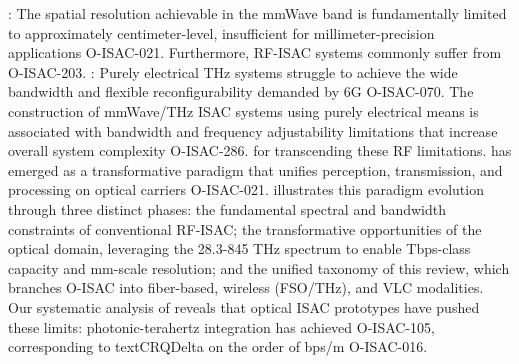 : The spatial resolution achievable in the mmWave band is fundamentally limited to approximately centimeter-level, insufficient for millimeter-precision applications O-ISAC-021. Furthermore, RF-ISAC systems commonly suffer from  O-ISAC-203.\markdownRendererOlItemEnd 
{}: Purely electrical THz systems struggle to achieve the wide bandwidth and flexible reconfigurability demanded by 6G O-ISAC-070. The construction of mmWave/THz ISAC systems using purely electrical means is associated with bandwidth and frequency adjustability limitations that increase overall system complexity O-ISAC-286.\markdownRendererOlItemEnd 
\markdownRendererOlEnd \markdownRendererInterblockSeparator
{} for transcending these RF limitations.  has emerged as a transformative paradigm that unifies perception, transmission, and processing on optical carriers O-ISAC-021.  illustrates this paradigm evolution through three distinct phases:  the fundamental spectral and bandwidth constraints of conventional RF-ISAC;  the transformative opportunities of the optical domain, leveraging the 28.3-845 THz spectrum to enable Tbps-class capacity and mm-scale resolution; and  the unified taxonomy of this review, which branches O-ISAC into fiber-based, wireless (FSO/THz), and VLC modalities. Our systematic analysis of  reveals that optical ISAC prototypes have pushed these limits: photonic-terahertz integration has achieved  O-ISAC-105, corresponding to \markdownRendererDollarSign{}\markdownRendererBackslash{}text\markdownRendererLeftBrace{}CRQ\markdownRendererRightBrace{}\markdownRendererLeftBrace{}\markdownRendererBackslash{}Delta\markdownRendererRightBrace{}\markdownRendererDollarSign{} on the order of  bps/m O-ISAC-016.\markdownRendererParagraphSeparator
